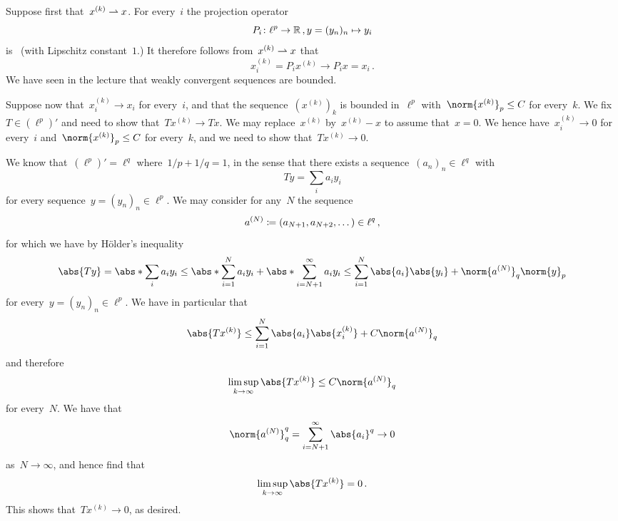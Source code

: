 \section{}





\subsection{}

Suppose first that~$x^{(k)} \rightharpoonup x$.
For every~$i$ the projection operator
\[
  P_i
  \colon
  \ell^p
  \to
  \mathbb{R}
  \,,
  y
  =
  (y_n)_n
  \mapsto
  y_i
\]
is~{\lipcont} (with Lipschitz constant~$1$.)
It therefore follows from~$x^{(k)} \rightharpoonup x$ that
\[
      x^{(k)}_i
  =   P_i x^{(k)}
  \to P_i x
  =   x_i \,.
\]
We have seen in the lecture that weakly convergent sequences are bounded.

Suppose now that~$x^{(k)}_i \to x_i$ for every~$i$, and that the sequence~$(x^{(k)})_k$ is bounded in~$\ell^p$ with~$\norm{x^{(k)}}_p \leq C$ for every~$k$.
We fix~$T \in (\ell^p)'$ and need to show that~$T x^{(k)} \to T x$.
We may replace~$x^{(k)}$ by~$x^{(k)} - x$ to assume that~$x = 0$.
We hence have~$x^{(k)}_i \to 0$ for every~$i$ and~$\norm{x^{(k)}}_p \leq C$ for every~$k$, and we need to show that~$T x^{(k)} \to 0$.

We know that~$(\ell^p)' = \ell^q$ where~$1/p + 1/q = 1$, in the sense that there exists a sequence~$(a_n)_n \in \ell^q$ with
\[
    T y
  = \sum_i a_i y_i
\]
for every sequence~$y = (y_n)_n \in \ell^p$.
We may consider for any~$N$ the sequence
\[
  a^{(N)}
  \coloneqq
  (a_{N+1}, a_{N+2}, \dotsc)
  \in
  \ell^q \,,
\]
for which we have by Hölder’s inequality
\[
  \abs{Ty}
  =
  \abs*{ \sum_i a_i y_i }
  \leq
  \abs*{ \sum_{i=1}^N a_i y_i }
  +
  \abs*{ \sum_{i=N+1}^\infty a_i y_i }
  \leq
  \sum_{i=1}^N \abs{a_i} \abs{y_i}
  +
  \norm{ a^{(N)} }_q \norm{y}_p
\]
for every~$y = (y_n)_n \in \ell^p$.
We have in particular that
\[
  \abs{ T x^{(k)} }
  \leq
  \sum_{i=1}^N \abs{a_i} \abs{x^{(k)}_i}
  +
  C \norm{a^{(N)}}_q
\]
and therefore
\[
  \limsup_{k \to \infty} \abs{ T x^{(k)} }
  \leq
  C \norm{a^{(N)}}_q
\]
for every~$N$.
We have that
\[
  \norm{a^{(N)}}_q^q
  =
  \sum_{i=N+1}^\infty \abs{a_i}^q
  \to
  0
\]
as~$N \to \infty$, and hence find that
\[
  \limsup_{k \to \infty} \abs{ T x^{(k)} }
  =
  0 \,.
\]
This shows that~$T x^{(k)} \to 0$, as desired.





